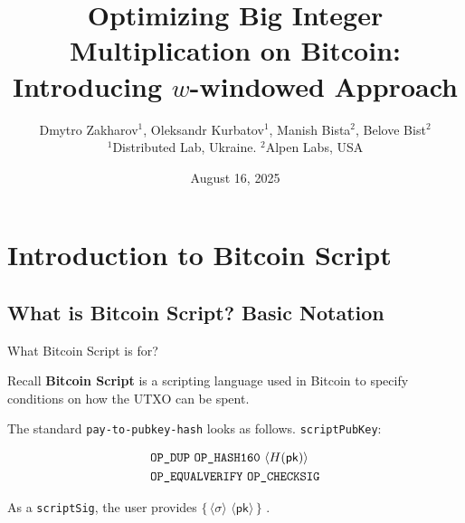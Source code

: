 \documentclass{zkdl-presentation-template}
\title[$w$-window multiplication]{\large\textbf{Optimizing Big Integer Multiplication on Bitcoin: Introducing $w$-windowed Approach}}
\author{Dmytro Zakharov$^1$, Oleksandr Kurbatov$^1$, Manish Bista$^2$, Belove Bist$^2$ \\ $^1$Distributed Lab, Ukraine. $^2$Alpen Labs, USA}
\date{August 16, 2025}
\newcommand{\elem}[1]{\, \langle #1 \rangle \,}
\newcommand{\opcode}[1]{\, \texttt{#1} \,}
\newcommand{\script}[1]{ $\big\{ #1 \big\}$ }
\begin{document}
    \frame {
        \titlepage
    }
 

	\section{Introduction to Bitcoin Script}

    \subsection{What is Bitcoin Script? Basic Notation}

    \begin{frame}{What Bitcoin Script is for?}
        \begin{block}{Recall}
            \textbf{Bitcoin Script} is a scripting language used in Bitcoin to specify conditions on how the UTXO can be spent.\pause
        \end{block}

        \begin{example}
            The standard \texttt{pay-to-pubkey-hash} looks as follows. \texttt{scriptPubKey}:
              \begin{empheqboxed}
                \small
                \begin{align*}
                    &\opcode{\texttt{OP\_DUP}} \opcode{\texttt{OP\_HASH160}} \elem{H(\mathsf{pk})} \\ &\opcode{OP\_EQUALVERIFY} 
                    \opcode{OP\_CHECKSIG}
                \end{align*}
              \end{empheqboxed}

            \pause As a \texttt{scriptSig}, the user provides \script{\elem{\sigma} \elem{\mathsf{pk}}}.
        \end{example}
    \end{frame}
\end{document}
